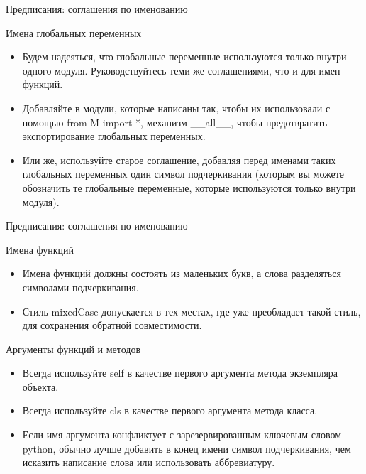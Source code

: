 \documentclass[xcolor=table]{beamer}
\begin{document}
\begin{frame}[fragile]{Предписания: соглашения по именованию}
	\begin{block}{Имена глобальных переменных}
		\begin{itemize}
			\item Будем надеяться, что глобальные переменные используются только внутри одного модуля. Руководствуйтесь теми же соглашениями, что и для имен функций.
			\item Добавляйте в модули, которые написаны так, чтобы их использовали с помощью from M import *, механизм \_\_all\_\_, чтобы предотвратить экспортирование глобальных переменных. 
			\item Или же, используйте старое соглашение, добавляя перед именами таких глобальных переменных один символ подчеркивания (которым вы можете обозначить те глобальные переменные, которые используются только внутри модуля).
		\end{itemize}			
	\end{block}
\end{frame}

\begin{frame}[fragile]{Предписания: соглашения по именованию}
	\begin{block}{Имена функций}
		\begin{itemize}
			\item Имена функций должны состоять из маленьких букв, а слова разделяться символами подчеркивания.
			\item Стиль mixedCase допускается в тех местах, где уже преобладает такой стиль, для сохранения обратной совместимости.
		\end{itemize}			
	\end{block}
	\begin{block}{Аргументы функций и методов}
		\begin{itemize}
			\item Всегда используйте self в качестве первого аргумента метода экземпляра объекта.
			\item Всегда используйте cls в качестве первого аргумента метода класса.
			\item Если имя аргумента конфликтует с зарезервированным ключевым словом python, обычно лучше добавить в конец имени символ подчеркивания, чем исказить написание слова или использовать аббревиатуру. 
		\end{itemize}			
	\end{block}	
\end{frame}
\end{document}
